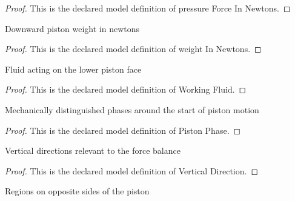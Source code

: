 \begin{proof}
  This is the declared model definition of pressure Force In Newtons.
\end{proof}
\begin{definition}
  \label{def:physics:phyx-mini-0662:phyxminiproblems-problemphyxmini0662-weightinnewtons}
  Downward piston weight in newtons
\end{definition}
\begin{proof}
  This is the declared model definition of weight In Newtons.
\end{proof}
\begin{definition}
  \label{def:physics:phyx-mini-0662:phyxminiproblems-problemphyxmini0662-workingfluid}
  Fluid acting on the lower piston face
\end{definition}
\begin{proof}
  This is the declared model definition of Working Fluid.
\end{proof}
\begin{definition}
  \label{def:physics:phyx-mini-0662:phyxminiproblems-problemphyxmini0662-pistonphase}
  Mechanically distinguished phases around the start of piston motion
\end{definition}
\begin{proof}
  This is the declared model definition of Piston Phase.
\end{proof}
\begin{definition}
  \label{def:physics:phyx-mini-0662:phyxminiproblems-problemphyxmini0662-verticaldirection}
  Vertical directions relevant to the force balance
\end{definition}
\begin{proof}
  This is the declared model definition of Vertical Direction.
\end{proof}
\begin{definition}
  \label{def:physics:phyx-mini-0662:phyxminiproblems-problemphyxmini0662-pistonfaceregion}
  Regions on opposite sides of the piston
\end{definition}
